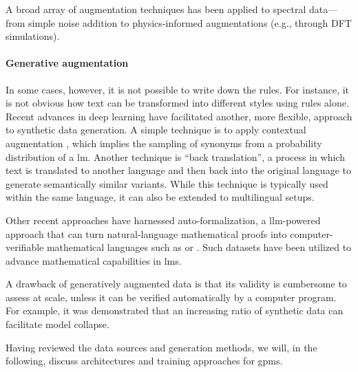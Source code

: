 A broad array of augmentation techniques has been applied to spectral data---from simple noise addition\autocite{ke2018convolutional,moreno2022application} to physics-informed augmentations (e.g., through DFT simulations).\autocite{oviedo2019fast,gao2020general}

\paragraph{Generative augmentation}
In some cases, however, it is not possible to write down the rules. For instance, it is not obvious how text can be transformed into different styles using rules alone.
Recent advances in deep learning have facilitated another, more flexible, approach to synthetic data generation. \autocite{maini2024rephrasing} 
A simple technique is to apply contextual augmentation \autocite{kobayashi2018contextual}, which implies the sampling of synonyms from a probability distribution of a \gls{lm}. 
Another technique is \enquote{back translation},\autocite{edunov2018understanding} a process in which text is translated to another language and then back into the original language to generate semantically similar variants. 
While this technique is typically used within the same language,\autocite{lu2024mathgenie0} it can also be extended to multilingual setups\autocite{hong2024cantonmt0}.
 
Other recent approaches have harnessed auto-formalization\autocite{NEURIPS2022_d0c6bc64}, a \gls{llm}-powered approach that can turn natural-language mathematical proofs into computer-verifiable mathematical languages such as \autocite{de2015lean} or \autocite{wenzel2008isabelle}. 
Such datasets have been utilized to advance mathematical capabilities in \glspl{lm}.\autocite{xin2024deepseek,trinh2024solving}

A drawback of generatively augmented data is that its validity is cumbersome to assess at scale, unless it can be verified automatically by a computer program. 
For example, it was demonstrated that an increasing ratio of synthetic data can facilitate model collapse.\autocite{kazdan2024collapse,shumailov2024ai}

Having reviewed the data sources and generation methods, we will, in the following, discuss architectures and training approaches for \glspl{gpm}.